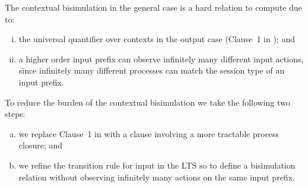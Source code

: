 The contextual bisimulation in the general case
is a hard relation to compute due to:
%
\begin{enumerate}[i)]
	\item	the universal quantifier over contexts in the output case
		(Clause~1 in ); and

	\item	a higher order input prefix can observe infinitely many
		different input actions, since infinitely many different
		processes can match the session type of an input prefix.
\end{enumerate}
%
To reduce the burden of the contextual bisimulation
we take the following two steps: 
%
\begin{enumerate}[(a)]
	\item	we replace Clause~1 in  with a clause
		involving a more tractable process closure; and
	\item	we refine the transition rule for input in the LTS
		so to define a bisimulation relation
		without observing infinitely many actions on the same input prefix. 
\end{enumerate}
%



